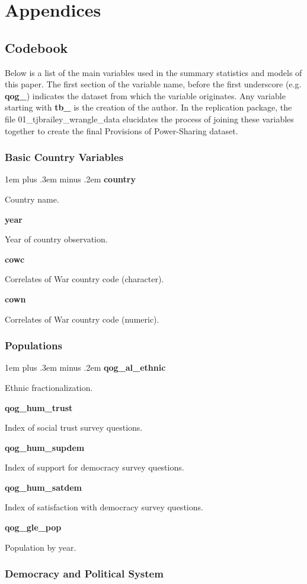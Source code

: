 \documentclass[12pt]{article}
\begin{document}
\section{Appendices}
\subsection{Codebook}

Below is a list of the main variables used in the summary statistics and models of this paper. The first section of the variable name, before the first underscore (e.g. \textbf{qog\_}) indicates the dataset from which the variable originates. Any variable starting with \textbf{tb\_} is the creation of the author. In the replication package, the file 01\_tjbrailey\_wrangle\_data elucidates the process of joining these variables together to create the final Provisions of Power-Sharing dataset.  

\newlength\cbl
\newenvironment{codebook}[1][rob\_avprison1]{
	\settowidth{\cbl}{#1}
	\parskip1em plus .3em minus .2em
	\parindent0pt
	\def\code##1##2{{\bfseries ##1}\hfill
		\parbox[t]{\dimexpr\linewidth-15em-\cbl}{##2}\par}}{\noindent}

\singlespacing

\subsubsection{Basic Country Variables}
	
\begin{codebook}
	\code{country}{Country name.}
	\code{year}{Year of country observation.}
	\code{cowc}{Correlates of War country code (character).}
	\code{cown}{Correlates of War country code (numeric).}
\end{codebook}

\subsubsection{Populations}

\begin{codebook}
	\code{qog\_al\_ethnic}{Ethnic fractionalization.}
	\code{qog\_hum\_trust}{Index of social trust survey questions.}
	\code{qog\_hum\_supdem}{Index of support for democracy survey questions.}
	\code{qog\_hum\_satdem}{Index of satisfaction with democracy survey questions.}
	\code{qog\_gle\_pop}{Population by year.}
\end{codebook}

\subsubsection{Democracy and Political System}
\end{document}
